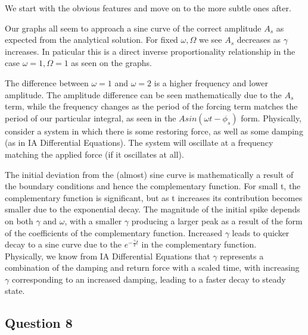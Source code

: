 \documentclass[10pt,a4paper]{report}
\begin{document}
We start with the obvious features and move on to the more subtle ones after. \par
\vspace{5mm}
Our graphs all seem to approach a sine curve of the correct amplitude $A_s$ as expected from the analytical solution. For fixed $\omega, \Omega$ we see $A_s$ decreases as $\gamma$ increases. In paticular this is a direct inverse proportionality relationship in the case $\omega=1, \Omega=1$ as seen on the graphs.\par
\vspace{5mm}
The difference between $\omega=1$ and $\omega=2$ is a higher frequency and lower amplitude. The amplitude difference can be seen mathematically due to the $A_s$ term, while the frequency changes as the period of the forcing term matches the period of our particular integral, as seen in the $Asin(\omega t-\phi_s)$ form. Physically, consider a system in which there is some restoring force, as well as some damping (as in IA Differential Equations). The system will oscillate at a frequency matching the applied force (if it oscillates at all).\par
\vspace{5mm}
The initial deviation from the (almost) sine curve is mathematically a result of the boundary conditions and hence the complementary function. For small t, the complementary function is significant, but as t increases its contribution becomes smaller due to the exponential decay. The magnitude of the initial spike depends on both $\gamma$ and $\omega$, with a smaller $\gamma$ producing a larger peak as a result of the form of the coefficients of the complementary function.  Increased $\gamma$ leads to quicker decay to a sine curve due to the $e^{-\frac{\gamma}{2}t}$ in the complementary function. \\


Physically, we know from IA Differential Equations that $\gamma$ represents a combination of the damping and return force with a scaled time, with increasing $\gamma$ corresponding to an  increased damping, leading to a faster decay to steady state. \par

\newpage

\subsection*{Question 8}
\end{document}
